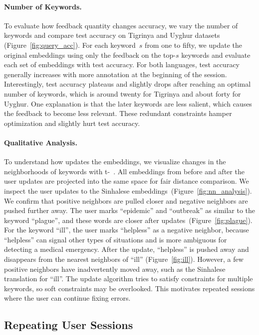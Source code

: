 \paragraph{Number of Keywords.}
To evaluate how feedback quantity changes accuracy, we vary the number of
keywords and compare test accuracy on Tigrinya and Uyghur datasets
(Figure~\ref{fig:query_acc}).
For each keyword~$s$ from one to fifty, we update the original embeddings using
only the feedback on the top-$s$ keywords and evaluate each set of
embeddings with test accuracy.
For both languages, test accuracy generally increases with more annotation at
the beginning of the session.
Interestingly, test accuracy plateaus and slightly drops after reaching an
optimal number of keywords, which is around twenty for Tigrinya and about
forty for Uyghur.
One explanation is that the later keywords are less salient, which causes the
feedback to become less relevant.
These redundant constraints hamper optimization and slightly hurt test accuracy.

\paragraph{Qualitative Analysis.}
To understand how \name{} updates the embeddings, we visualize changes in the
neighborhoods of keywords with t-~\citep{maaten-08}.
All embeddings from before and after the user updates are projected into the
same space for fair distance comparison.
We inspect the user updates to the Sinhalese 
embeddings~(Figure~\ref{fig:nn_analysis}).
We confirm that positive neighbors are pulled closer and negative neighbors
are pushed further away.
The user marks ``epidemic'' and ``outbreak'' as similar to the keyword
``plague'', and these words are closer after updates~(Figure~\ref{fig:plague}).
For the keyword ``ill'', the user marks ``helpless'' as a negative neighbor,
because ``helpless'' can signal other types of situations and is more ambiguous
for detecting a medical emergency.
After the update, ``helpless'' is pushed away and disappears from the nearest
neighbors of ``ill'' (Figure~\ref{fig:ill}).
However, a few positive neighbors have inadvertently moved away,
such as the Sinhalese translation for ``ill''.
The update algorithm tries to satisfy constraints for multiple keywords, so
soft constraints may be overlooked.
This motivates repeated \name{} sessions where the user can continue
fixing errors.

\subsection{Repeating User Sessions}

